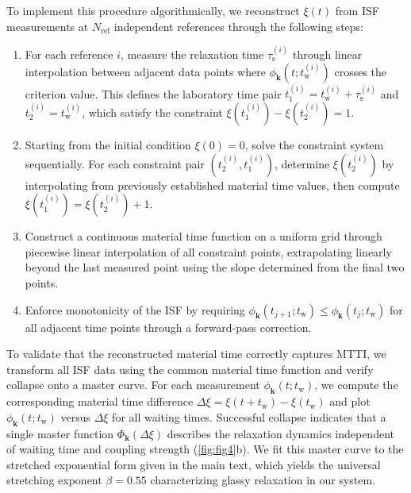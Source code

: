 \documentclass[%
 reprint,
 amsmath,amssymb,
 aps,
]{revtex4-2}
\begin{document}
To implement this procedure algorithmically, we reconstruct $\xi(t)$ from ISF measurements at $N_\mathrm{ref}$ independent references through the following steps:
\begin{enumerate}
\item For each reference $i$, measure the relaxation time $\tau_\mathrm{s}^{(i)}$ through linear interpolation between adjacent data points where $\phi_{\bm{k}}(t; t_\mathrm{w}^{(i)})$ crosses the criterion value. This defines the laboratory time pair $t_1^{(i)} = t_\mathrm{w}^{(i)} + \tau_\mathrm{s}^{(i)}$ and $t_2^{(i)} = t_\mathrm{w}^{(i)}$, which satisfy the constraint $\xi(t_1^{(i)}) - \xi(t_2^{(i)}) = 1$.
\item Starting from the initial condition $\xi(0)=0$, solve the constraint system sequentially. For each constraint pair $(t_2^{(i)}, t_1^{(i)})$, determine $\xi(t_2^{(i)})$ by interpolating from previously established material time values, then compute $\xi(t_1^{(i)}) = \xi(t_2^{(i)}) + 1$.
\item Construct a continuous material time function on a uniform grid through piecewise linear interpolation of all constraint points, extrapolating linearly beyond the last measured point using the slope determined from the final two points.
\item Enforce monotonicity of the ISF by requiring $\phi_{\bm{k}}(t_{j+1}; t_\mathrm{w}) \leq \phi_{\bm{k}}(t_j; t_\mathrm{w})$ for all adjacent time points through a forward-pass correction.
\end{enumerate}

To validate that the reconstructed material time correctly captures MTTI, we transform all ISF data using the common material time function and verify collapse onto a master curve. For each measurement $\phi_{\bm{k}}(t; t_\mathrm{w})$, we compute the corresponding material time difference $\Delta\xi = \xi(t+t_\mathrm{w}) - \xi(t_\mathrm{w})$ and plot $\phi_{\bm{k}}(t; t_\mathrm{w})$ versus $\Delta\xi$ for all waiting times. Successful collapse indicates that a single master function $\Phi_{\bm{k}}(\Delta\xi)$ describes the relaxation dynamics independent of waiting time and coupling strength (\cref{fig:fig4}b). 
We fit this master curve to the stretched exponential form given in the main text, which yields the universal stretching exponent $\beta = 0.55$ characterizing glassy relaxation in our system.
\end{document}
